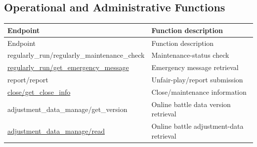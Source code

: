 \subsection{Operational and Administrative Functions}

\begin{longtable}{>{\ttfamily}p{}p{}}
\toprule
Endpoint & Function description \\
\midrule
\endfirsthead%

\toprule
Endpoint & Function description \\
\midrule
\endhead%

regularly\_run/regularly\_maintenance\_check
    & Maintenance-status check \\

\hyperref[subsec:api_regularly_run_get_emergency_message]
    {regularly\_run/get\_emergency\_message}
    & Emergency message retrieval \\

report/report
    & Unfair-play/report submission \\

\hyperref[subsec:api_close_get_close_info]
    {close/get\_close\_info}
    & Close/maintenance information \\

adjustment\_data\_manage/get\_version
    & Online battle data version retrieval \\

\hyperref[subsec:api_adjustment_data_manage_read]
    {adjustment\_data\_manage/read}
    & Online battle adjustment-data retrieval \\

\bottomrule
\end{longtable}

\newpage